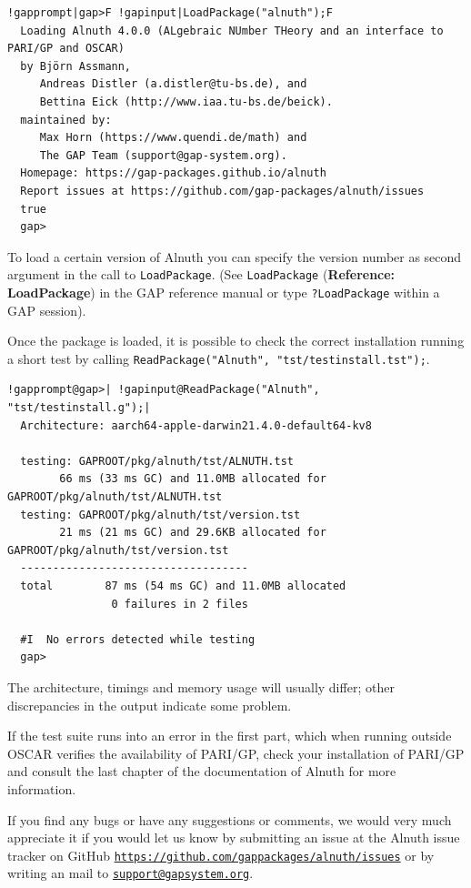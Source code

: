 \documentclass[a4paper,11pt]{report}
\begin{document}
{{ 
\begin{Verbatim}[commandchars=!|F,fontsize=\small,frame=single,label=Example]
  !gapprompt|gap>F !gapinput|LoadPackage("alnuth");F
  Loading Alnuth 4.0.0 (ALgebraic NUmber THeory and an interface to PARI/GP and OSCAR)
  by Björn Assmann,
     Andreas Distler (a.distler@tu-bs.de), and
     Bettina Eick (http://www.iaa.tu-bs.de/beick).
  maintained by:
     Max Horn (https://www.quendi.de/math) and
     The GAP Team (support@gap-system.org).
  Homepage: https://gap-packages.github.io/alnuth
  Report issues at https://github.com/gap-packages/alnuth/issues
  true
  gap>
\end{Verbatim}
 To load a certain version of \textsf{Alnuth} you can specify the version number as second argument in the call to \texttt{LoadPackage}. (See \texttt{LoadPackage} (\textbf{Reference: LoadPackage}) in the \textsf{GAP} reference manual or type \texttt{?LoadPackage} within a GAP session). 

 Once the package is loaded, it is possible to check the correct installation
running a short test by calling \texttt{ReadPackage("Alnuth", "tst/testinstall.tst");}. 

 
\begin{Verbatim}[commandchars=!@|,fontsize=\small,frame=single,label=Example]
  !gapprompt@gap>| !gapinput@ReadPackage("Alnuth", "tst/testinstall.g");|
  Architecture: aarch64-apple-darwin21.4.0-default64-kv8
  
  testing: GAPROOT/pkg/alnuth/tst/ALNUTH.tst
        66 ms (33 ms GC) and 11.0MB allocated for GAPROOT/pkg/alnuth/tst/ALNUTH.tst
  testing: GAPROOT/pkg/alnuth/tst/version.tst
        21 ms (21 ms GC) and 29.6KB allocated for GAPROOT/pkg/alnuth/tst/version.tst
  -----------------------------------
  total        87 ms (54 ms GC) and 11.0MB allocated
                0 failures in 2 files
  
  #I  No errors detected while testing
  gap>
\end{Verbatim}
 The architecture, timings and memory usage will usually differ; other
discrepancies in the output indicate some problem. 

 If the test suite runs into an error in the first part, which when running
outside OSCAR verifies the availability of PARI/GP, check your installation of
PARI/GP and consult the last chapter of the documentation of \textsf{Alnuth} for more information. 

 If you find any bugs or have any suggestions or comments, we would very much
appreciate it if you would let us know by submitting an issue at the \textsf{Alnuth} issue tracker on GitHub \href{https://github.com/gap-packages/alnuth/issues} {\texttt{https://github.com/gap\texttt{}packages/alnuth/issues}} or by writing an mail to \href{mailto://support@gap-system.org} {\texttt{support@gap\texttt{}system.org}}. }

 }
\end{document}
